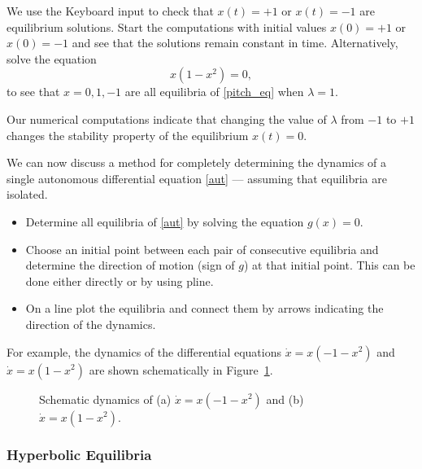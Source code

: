 \documentclass{ximera}
\begin{document}
We use the {\sf Keyboard input} to check that $x(t) = +1$ or
$x(t) = -1$ are equilibrium solutions.  Start the computations
with initial values $x(0) = +1$ or $x(0) = -1$ and see that the
solutions remain constant in time.  Alternatively, solve the
equation
\[
x(1-x^2) = 0,
\]
to see that $x=0,1,-1$ are all equilibria of \eqref{pitch_eq} when
$\lambda=1$.

Our numerical computations indicate that changing the
value of $\lambda$ from $-1$ to $+1$ changes the stability
property of the equilibrium $x(t)=0$.

We can now discuss a method for completely determining the
dynamics of a single autonomous differential equation \eqref{aut}
--- assuming that equilibria are isolated.

\begin{itemize}
\item Determine all equilibria of \eqref{aut} by solving the
equation $g(x)=0$.
\item Choose an initial point between each pair of consecutive
equilibria and determine the direction of motion (sign of $g$) at
that initial point. This can be done either directly or by using
{\sf pline}.
\item On a line plot the equilibria  and
connect them by arrows indicating the direction of the dynamics.
\end{itemize}
For example, the dynamics of the differential equations $\dot{x}
= x(-1-x^2)$ and $\dot{x} = x(1-x^2)$ are shown schematically in
Figure~\ref{pitch3}.

\begin{figure}[htb]
       \centerline{%
	}
\caption{Schematic dynamics of (a) $\dot{x}=x(-1-x^2)$ and (b) $\dot{x}=x(1-x^2)$.}
\label{pitch3}
\end{figure}

\subsubsection*{Hyperbolic Equilibria}
\end{document}
